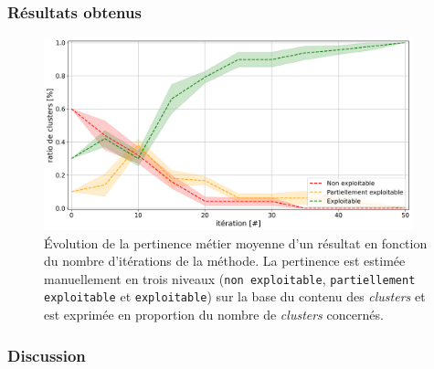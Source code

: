 		\subsubsection{Résultats obtenus}
		
			
			
			\begin{figure}[!htb]
				\centering
				\includegraphics[width=0.95\textwidth]{figures/etude-pertinence-llm-check-clustering-annotation-favori}
				\caption{Évolution de la pertinence métier moyenne d'un résultat en fonction du nombre d'itérations de la méthode.
				La pertinence est estimée manuellement en trois niveaux (\texttt{non exploitable}, \texttt{partiellement exploitable} et \texttt{exploitable}) sur la base du contenu des \textit{clusters} et est exprimée en proportion du nombre de \textit{clusters} concernés.}
				\label{figure:4.4.1-ETUDE-PERTINENCE-VERIFICATION-MANUELLE}
			\end{figure}

		\subsubsection{Discussion}
		
			
	
	
